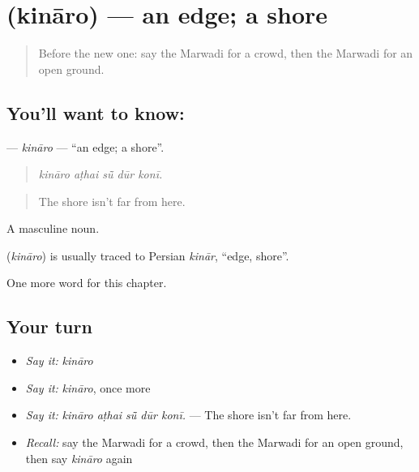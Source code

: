 \section[\texorpdfstring{\mw{किनारो} (kināro)}{किनारो (kināro)}]{ (kināro) — an edge; a shore}

\label{lesson:MW-C204-kinaro}



\begin{quote}
Before the new one: say the Marwadi for a crowd, then the Marwadi for an open ground.
\end{quote}

\subsection*{You'll want to know: }
\textbf{} — \emph{kināro} — \textquotedblleft{}an edge; a shore\textquotedblright{}.

\begin{quote}
    
\end{quote}

\begin{quote}
\emph{kināro aṭhai sū̃ dūr konī.}
\end{quote}

\begin{quote}
The shore isn't far from here.
\end{quote}

A masculine noun.

\begin{cousinweb}
\textbf{} (\emph{kināro}) is usually traced to Persian \emph{kinār}, \textquotedblleft{}edge, shore\textquotedblright{}.
\end{cousinweb}

\begin{grammarlens}[title={What you've built}]
One more word for this chapter.
\end{grammarlens}

\subsection*{Your turn}
\begin{itemize}
\raggedright
  \item \emph{Say it:} \emph{kināro}
  \item \emph{Say it:} \emph{kināro}, once more
  \item \emph{Say it:} \emph{kināro aṭhai sū̃ dūr konī.} — The shore isn't far from here.
  \item \emph{Recall:} say the Marwadi for a crowd, then the Marwadi for an open ground, then say \emph{kināro} again
\end{itemize}

